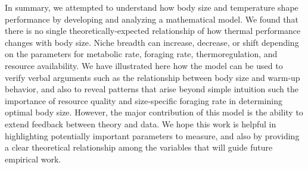 In summary, we attempted to understand how body size and temperature shape performance by developing and analyzing a mathematical model.
We found that there is no single theoretically-expected relationship of how thermal performance changes with body size.
Niche breadth can increase, decrease, or shift depending on the parameters for metabolic rate, foraging rate, thermoregulation, and resource availability.
We have illustrated here how the model can be used to verify verbal arguments such as the relationship between body size and warm-up behavior, and also to reveal patterns that arise beyond simple intuition such the importance of resource quality and size-specific foraging rate in determining optimal body size.
However, the major contribution of this model is the ability to extend feedback between theory and data.
We hope this work is helpful in highlighting potentially important parameters to measure, and also by providing a clear theoretical relationship among the variables that will guide future empirical work.
